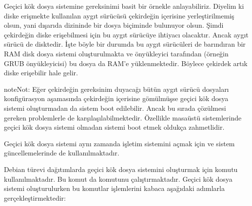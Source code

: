 \documentclass[a4paper,10pt,turkish]{sphinxmanual}
\begin{document}
\sphinxAtStartPar
Geçici kök dosya sistemine gereksinimi basit bir örnekle anlayabiliriz. Diyelim ki diske erişmekte
kullanılan aygıt sürücüsü çekirdeğin içerisine yerleştirilmemiş olsun, yani dışarıda
 dizininde bir dosya biçiminde bulunuyor olsun. Şimdi çekirdeğin diske
erişebilmesi için bu aygıt sürücüye ihtiyacı olacaktır. Ancak aygıt sürücü de disktedir. İşte böyle
bir durumda bu aygıt sürücüleri de barındıran bir RAM disk dosya sistemi oluşturulmakta ve önyükleyici
tarafından (örneğin GRUB önyükleyicisi) bu dosya da RAM’e yüklenmektedir. Böylece çekirdek artık
diske erişebilir hale gelir.

\begin{sphinxadmonition}{note}{Not:}
\sphinxAtStartPar
Eğer çekirdeğin gereksinim duyacağı bütün aygıt sürücü dosyaları konfigürasyon aşamasında
çekirdeğin içerisine gömülmüşse geçici kök dosya sistemi oluşturmadan da sistem boot edilebilir.
Ancak bu sırada çözülmesi gereken problemlerle de karşılaşılabilmektedir. Özellikle masaüstü
sistemlerinde geçici kök dosya sistemi olmadan sistemi boot etmek oldukça zahmetlidir.
\end{sphinxadmonition}

\sphinxAtStartPar
Geçici kök dosya sistemi aynı zamanda işletim sistemini  açmak için ve
sistem güncellemelerinde de kullanılmaktadır.

\sphinxAtStartPar
Debian türevi dağıtımlarda geçici kök dosya sistemini oluşturmak için  komutu
kullanılmaktadır. Bu komut da  komutunu çalıştırmaktadır. Geçici kök dosya sistemi
oluşturulurken bu komutlar işlemlerini kabaca aşağıdaki adımlarla gerçekleştirmektedir:

\end{document}
